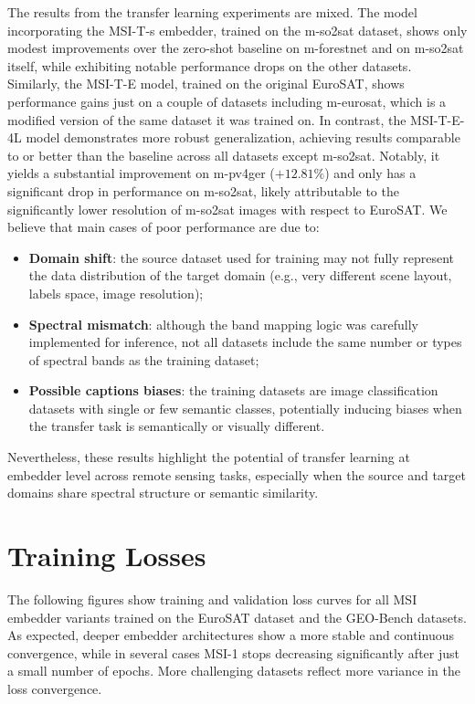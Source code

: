 \documentclass[a4paper, oneside, english]{sapthesis} %
\begin{document}
The results from the transfer learning experiments are mixed. The model incorporating the MSI-T-s embedder, trained on the m-so2sat dataset, shows only modest improvements over the zero-shot baseline on m-forestnet and on m-so2sat itself, while exhibiting notable performance drops on the other datasets. Similarly, the MSI-T-E model, trained on the original EuroSAT, shows performance gains just on a couple of datasets including m-eurosat, which is a modified version of the same dataset it was trained on. In contrast, the MSI-T-E-4L model demonstrates more robust generalization, achieving results comparable to or better than the baseline across all datasets except m-so2sat. Notably, it yields a substantial improvement on m-pv4ger ($+12.81\%$) and only has a significant drop in performance on m-so2sat, likely attributable to the significantly lower resolution of m-so2sat images with respect to EuroSAT. We believe that main cases of poor performance are due to:

\begin{itemize}
    \item \textbf{Domain shift}: the source dataset used for training may not fully represent the data distribution of the target domain (e.g., very different scene layout, labels space, image resolution);
    \item \textbf{Spectral mismatch}: although the band mapping logic was carefully implemented for inference, not all datasets include the same number or types of spectral bands as the training dataset;
    \item \textbf{Possible captions biases}: the training datasets are image classification datasets with single or few semantic classes, potentially inducing biases when the transfer task is semantically or visually different.
\end{itemize}

Nevertheless, these results highlight the potential of transfer learning at embedder level across remote sensing tasks, especially when the source and target domains share spectral structure or semantic similarity.

\section{Training Losses}

The following figures show training and validation loss curves for all MSI embedder variants trained on the EuroSAT dataset and the GEO-Bench datasets. As expected, deeper embedder architectures show a more stable and continuous convergence, while in several cases MSI-1 stops decreasing significantly after just a small number of epochs. More challenging datasets reflect more variance in the loss convergence. 
\end{document}
